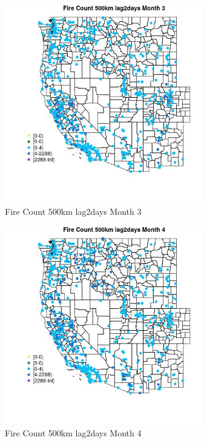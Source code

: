 \begin{figure} 
\centering  
\includegraphics[width=0.77\textwidth]{Code_Outputs/Report_ML_input_PM25_Step4_part_e_de_duplicated_aves_compiled_2019-05-21wNAs_MapObsMo3Fire_Count_500km_lag2days.jpg} 
\caption{\label{fig:Report_ML_input_PM25_Step4_part_e_de_duplicated_aves_compiled_2019-05-21wNAsMapObsMo3Fire_Count_500km_lag2days}Fire Count 500km lag2days Month 3} 
\end{figure} 
 

\begin{figure} 
\centering  
\includegraphics[width=0.77\textwidth]{Code_Outputs/Report_ML_input_PM25_Step4_part_e_de_duplicated_aves_compiled_2019-05-21wNAs_MapObsMo4Fire_Count_500km_lag2days.jpg} 
\caption{\label{fig:Report_ML_input_PM25_Step4_part_e_de_duplicated_aves_compiled_2019-05-21wNAsMapObsMo4Fire_Count_500km_lag2days}Fire Count 500km lag2days Month 4} 
\end{figure} 
 

